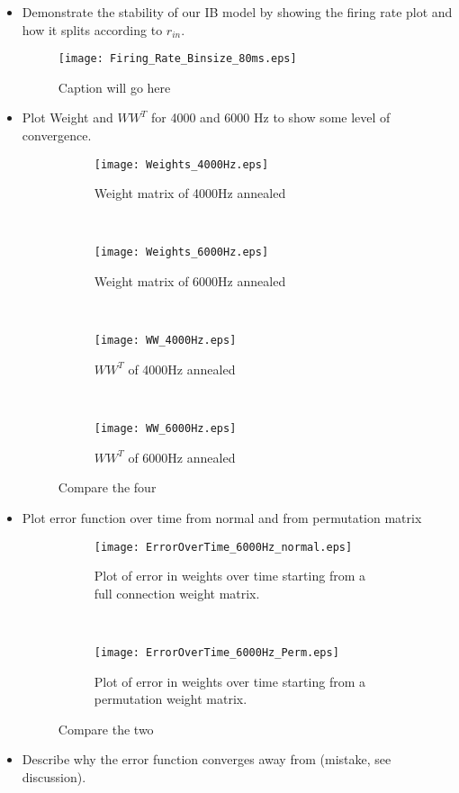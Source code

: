 \begin{itemize}
\item Demonstrate the stability of our IB model by showing the firing rate plot and how it splits according to \(r_{in}\).

\begin{figure}[H]
\centering
\texttt{[image: Firing\_Rate\_Binsize\_80ms.eps]}
\label{FR}
\caption{Caption will go here}
\end{figure}

\item Plot Weight and \(WW^T\) for 4000 and 6000 Hz to show some level of convergence.

\begin{figure}[H]
\centering
\begin{subfigure}[b]{0.49\textwidth}
\texttt{[image: Weights\_4000Hz.eps]}
\label{Weights: 4000Hz, basic}
\caption{Weight matrix of 4000Hz annealed}
\end{subfigure}
\,
\begin{subfigure}[b]{0.49\textwidth}
\texttt{[image: Weights\_6000Hz.eps]}
\label{Weights: 6000Hz, basic}
\caption{Weight matrix of 6000Hz annealed}
\end{subfigure}
\\
\begin{subfigure}[b]{0.49\textwidth}
\texttt{[image: WW\_4000Hz.eps]}
\label{Weights: 4000Hz, product}
\caption{\(WW^T\) of 4000Hz annealed}
\end{subfigure}
\,
\begin{subfigure}[b]{0.49\textwidth}
\texttt{[image: WW\_6000Hz.eps]}
\label{Weights: 6000Hz, product}
\caption{\(WW^T\) of 6000Hz annealed}
\end{subfigure}
\label{Weights}
\caption{Compare the four}
\end{figure}

\item Plot error function over time from normal and from permutation matrix

\begin{figure}[H]
\centering
\begin{subfigure}[b]{0.49\textwidth}
\texttt{[image: ErrorOverTime\_6000Hz\_normal.eps]}
\label{Error_over_time: normal}
\caption{Plot of error in weights over time starting from a full connection weight matrix.}
\end{subfigure}
\,
\begin{subfigure}[b]{0.49\textwidth}
\texttt{[image: ErrorOverTime\_6000Hz\_Perm.eps]}
\label{Error_over_time: permutation}
\caption{Plot of error in weights over time starting from a permutation weight matrix.}
\end{subfigure}
\label{Error_over_time}
\caption{Compare the two}
\end{figure}

\item Describe why the error function converges away from (mistake, see discussion).
\end{itemize}

